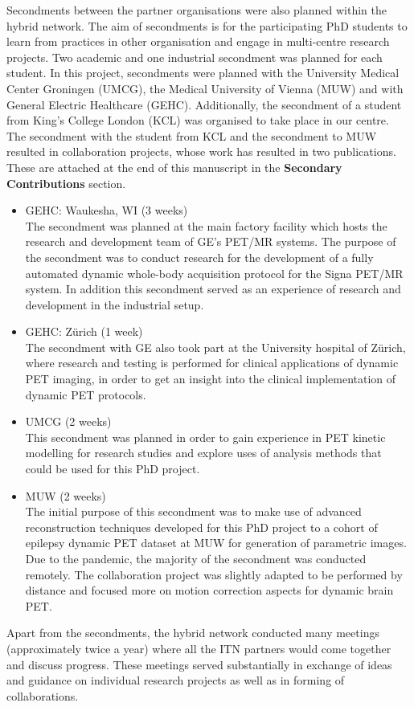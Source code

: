 Secondments between the partner organisations were also planned within the \gls{hybrid} network. The aim of secondments is for the participating PhD students to learn from practices in other organisation and engage in multi-centre research projects. Two academic and one industrial secondment was planned for each student. 
In this project, secondments were planned with the University Medical Center Groningen (UMCG), the Medical University of Vienna (MUW) and with General Electric Healthcare (GEHC).
Additionally, the secondment of a student from King's College London (KCL) was organised to take place in our centre. 
The secondment with the student from KCL and the secondment to MUW resulted in collaboration projects, whose work has resulted in two publications. These are attached at the end of this manuscript in the \textbf{Secondary Contributions} section. 

\begin{itemize}
    \item GEHC: Waukesha, WI (3 weeks) \\
    The secondment was planned at the main factory facility which hosts the research and development team of GE's PET/MR systems. The purpose of the secondment was to conduct research for the development of a fully automated dynamic whole-body acquisition protocol for the Signa PET/MR system.
    In addition this secondment served as an experience of research and development in the industrial setup.
    \item GEHC: Zürich (1 week) \\
    The secondment with GE also took part at the University hospital of Zürich, where research and testing is performed for clinical applications of dynamic PET imaging, in order to get an insight into the clinical implementation of dynamic PET protocols.
    \item UMCG (2 weeks) \\
    This secondment was planned in order to gain experience in PET kinetic modelling for research studies and explore uses of analysis methods that could be used for this PhD project. 
    \item MUW (2 weeks) \\
    The initial purpose of this secondment was to make use of advanced reconstruction techniques developed for this PhD project to a cohort of epilepsy dynamic PET dataset at MUW for generation of parametric images. Due to the pandemic, the majority of the secondment was conducted remotely. The collaboration project was slightly adapted to be performed by distance and focused more on motion correction aspects for dynamic brain PET.
    
\end{itemize}

Apart from the secondments, the \gls{hybrid} network conducted many meetings (approximately twice a year) where all the ITN partners would come together and discuss progress. These meetings served substantially in exchange of ideas and guidance on individual research projects as well as in forming of collaborations. 

